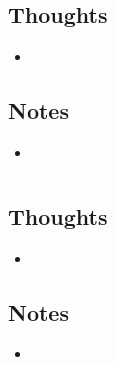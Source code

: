 \documentclass{article}
\begin{document}
\subsection{Thoughts}
\begin{itemize}
    \item
\end{itemize}

\subsection{Notes}
\begin{itemize}
    \item
\end{itemize}


    \section{}


\subsection{Thoughts}
\begin{itemize}
    \item
\end{itemize}

\subsection{Notes}
\begin{itemize}
    \item
\end{itemize}
\end{document}
